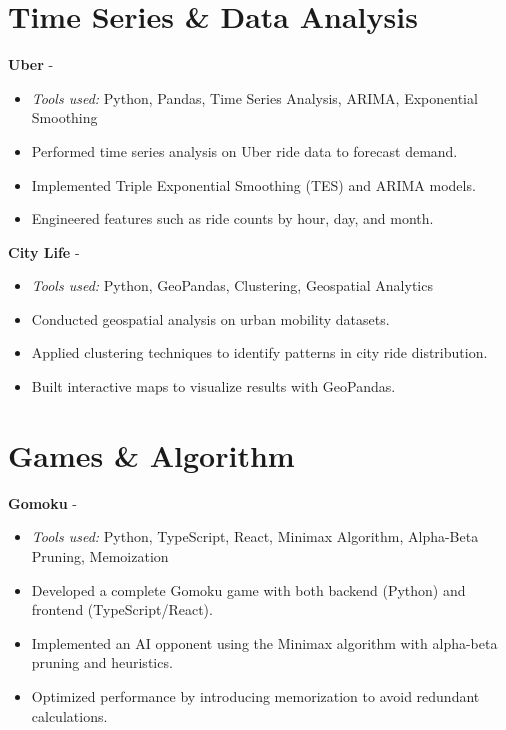 \documentclass[a4paper,11pt]{article}%
\begin{document}
\section*{Time Series \& Data Analysis}%
%
\noindent \textbf{Uber} - \href{https://github.com/sboof911/Uber}{{}}%
\begin{itemize}[leftmargin=2em,label={},parsep=0pt,topsep=1em]%
\item \textit{Tools used:} Python, Pandas, Time Series Analysis, ARIMA, Exponential Smoothing%
\item Performed time series analysis on Uber ride data to forecast demand.%
\item Implemented Triple Exponential Smoothing (TES) and ARIMA models.%
\item Engineered features such as ride counts by hour, day, and month.%
\end{itemize}%
%
\noindent \textbf{City Life} - \href{https://github.com/sboof911/City-Life}{{}}%
\begin{itemize}[leftmargin=2em,label={},parsep=0pt,topsep=1em]%
\item \textit{Tools used:} Python, GeoPandas, Clustering, Geospatial Analytics%
\item Conducted geospatial analysis on urban mobility datasets.%
\item Applied clustering techniques to identify patterns in city ride distribution.%
\item Built interactive maps to visualize results with GeoPandas.%
\end{itemize}%
\section*{Games \& Algorithm}%
%
\noindent \textbf{Gomoku} - \href{https://github.com/sboof911/Gomoku}{{}}%
\begin{itemize}[leftmargin=2em,label={},parsep=0pt,topsep=1em]%
\item \textit{Tools used:} Python, TypeScript, React, Minimax Algorithm, Alpha-Beta Pruning, Memoization%
\item Developed a complete Gomoku game with both backend (Python) and frontend (TypeScript/React).%
\item Implemented an AI opponent using the Minimax algorithm with alpha-beta pruning and heuristics.%
\item Optimized performance by introducing memorization to avoid redundant calculations.%
\end{itemize}%
\end{document}

